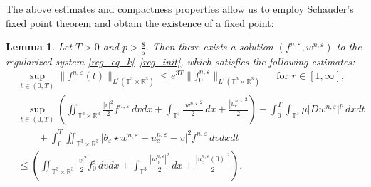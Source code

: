 \documentclass[10pt,reqno]{amsart}
\numberwithin{equation}{section}
\newtheorem{lemma}{Lemma}[section]
\newcommand{\R}{\mathbb R}
\newcommand{\T}{\mathbb T}
\newcommand{\bq}{\begin{equation}}
\newcommand{\eq}{\end{equation}}
\newcommand{\e}{\varepsilon}
\newcommand{\lt}{\left}
\newcommand{\rt}{\right}
\newcommand{\intt}{\int_{\T^3}}
\newcommand{\inttr}{\iint_{\T^3 \times \R^3}}
\begin{document}
The above estimates and compactness properties allow us to employ Schauder's fixed point theorem and obtain the existence of a fixed point:
\begin{lemma}\label{unif_eps_est}
Let $T > 0$ and $p > \frac85$. Then there exists a solution $(f^{n,\e}, w^{n,\e})$ to the regularized system \eqref{reg_eq_k}--\eqref{reg_init}, which satisfies the following estimates:
\bq\label{unif_est_soln}
\begin{aligned}
&\sup_{t \in (0,T)}\|f^{n,\e}(t)\|_{L^r(\T^3 \times \R^3)} \le e^{3T}\|f_0^{n,\e}\|_{L^r(\T^3 \times \R^3)} \quad \mbox{ for } r\in [1,\infty],\\
&\sup_{t \in (0,T)}\lt(\inttr \frac{|v|^2}{2} f^{n,\e}\,dvdx + \intt\frac{|w^{n,\e}|^2}{2}\,dx + \frac{|u_c^{n,\e}|^2}{2}\rt) + \int_0^T\intt \mu |D w^{n,\e}|^p\,dxdt \\
&\qquad+ \int_0^T \inttr |\theta_\e \star w^{n,\e}+u_c^{n,\e}-v|^2 f^{n,\e}\,dvdxdt\\
& \le \lt(\inttr \frac{|v|^2}{2} f_0^\e\,dvdx + \intt\frac{|w_0^{n,\e}|^2}{2}\,dx + \frac{|u_c^{n,\e}(0)|^2}{2}\rt).
\end{aligned}
\eq
\end{lemma}
\end{document}
